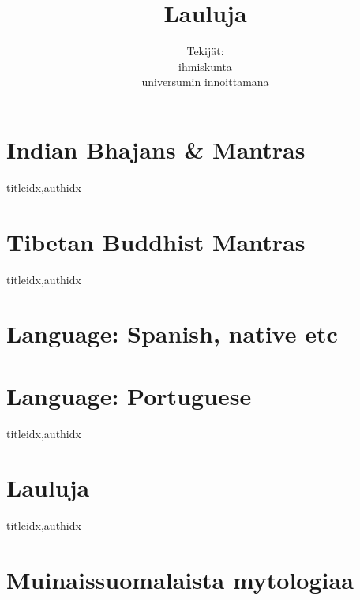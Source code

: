 \documentclass[twoside,10pt,finnish]{book}
\title{Lauluja}
\author{Tekijät: \\
        ihmiskunta \\
        universumin innoittamana}
\begin{document}
  \maketitle
  \tableofcontents %

  \clearpage\scleardpage
    \section{Indian Bhajans \& Mantras} 
      \begin{songs}{titleidx,authidx}
        \setcounter{songnum}{100}
        
      \end{songs}
     \scleardpage
    \section{Tibetan Buddhist Mantras}
      \begin{songs}{titleidx,authidx}
        \setcounter{songnum}{170}
        
      \end{songs}  
  
  \clearpage\scleardpage
    \section{Language: Spanish, native etc}
    \section{Language: Portuguese}
      \begin{songs}{titleidx,authidx}
        \setcounter{songnum}{270}
        
      \end{songs}
  
  \clearpage\scleardpage
  
  \clearpage\scleardpage
    \section{Lauluja}
      \begin{songs}{titleidx,authidx}
        \setcounter{songnum}{400}
        
      \end{songs}

    \clearpage\scleardpage
    \section{Muinaissuomalaista mytologiaa}
      
\end{document}
